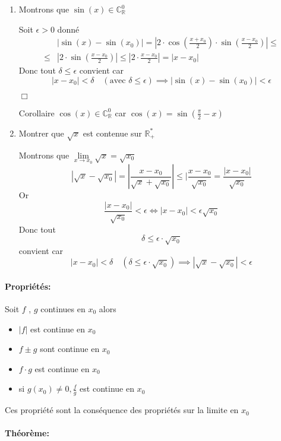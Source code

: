 \documentclass[
    11pt,
    a4paper,
    oneside,
    headinlcude, footinclude,
    twoside,
]{report}
\newcommand{\cqfd}[0]{\begin{flushright}$\Box$\end{flushright}}
\begin{document}
\begin{enumerate}
\item Montrons que $\sin(x) \in \mathbb{C}^{0}_{\mathbb{R}}$

Soit $\epsilon > 0$ donné
\[
\begin{split}
&| \sin(x) - \sin(x_{0}) | = | 2 \cdot \cos\left(\frac{x+x_{0}}{2}\right)
\cdot \sin\left(\frac{x - x_{0}}{2}\right) | \leq \\
\leq & |2 \cdot \sin\left(\frac{x - x_{0}}{2}\right)| \leq |2
\cdot \frac{x - x_{0}}{2}| = |x-x_{0}|
\end{split}
\]
Donc tout $\delta \leq \epsilon$ convient car $$| x - x_{0} | < \delta
\quad (\text{avec } \delta \leq \epsilon) \implies | \sin(x) - \sin(x_{0})
| < \epsilon$$
\cqfd

Corollaire $\cos(x) \in \mathbb{C}^{0}_{\mathbb{R}}$ car $\cos(x) = \sin\left(\frac{\pi}{2} -
x\right)$

\item Montrer que $\sqrt{x}$ est contenue sur $\mathbb{R}^{*}_{+}$ 

Montrons que $\lim\limits_{x \to x_{0}} \sqrt{x} = \sqrt{x_{0}}$
$$ | \sqrt{x} - \sqrt{x_{0}}| = | \frac{x - x_{0}}{\sqrt{x} + \sqrt{x_{0}}}
| \leq | \frac{x - x_{0}}{\sqrt{x_{0}}}  = \frac{| x - x_{0}|}{\sqrt{x_{0}}}$$
Or $$\frac{| x - x_{0} |}{\sqrt{x_{0}}} < \epsilon \iff | x - x_{0} |
< \epsilon \sqrt{x_{0}}$$
Donc tout $$\delta \leq \epsilon \cdot \sqrt{x_{0}}$$ convient car $$|
x - x_{0} | < \delta \quad (\delta \leq \epsilon \cdot \sqrt{x_{0}})
\implies |\sqrt{x} - \sqrt{x_{0}}| < \epsilon$$
\end{enumerate}

\paragraph{Propriétés:}
Soit $f$ , $g$ continues en $x_{0}$ alors

\begin{itemize}
\item $|f|$ est continue en $x_{0}$
\item $f\pm g$ sont continue en $x_{0}$
\item $f \cdot g$ est continue en $x_{0}$
\item si $g(x_{0}) \neq 0, \frac{f}{g}$ est continue en $x_{0}$
\end{itemize}
Ces propriété sont la conséquence des propriétés sur la limite en $x_{0}$

\paragraph{Théorème:}
\end{document}
